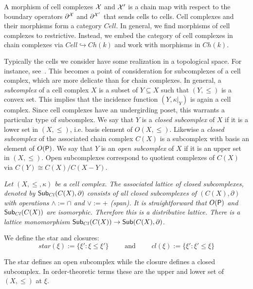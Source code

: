 A morphism of cell complexes ${\mathcal X}$ and  ${\mathcal X}'$ is a chain map with respect to the boundary operators $\partial^{\mathcal X}$ and $\partial^{{\mathcal X}'}$ that sends cells to cells.  Cell complexes and their morphisms form a category $Cell$. In general, we find morphisms of cell complexes to restrictive.  Instead, we embed the category of cell complexes in chain complexes via $Cell\hookrightarrow Ch(k)$ and work with morphisms in $Ch(k)$.


Typically the cells we consider have some realization in a topological space.  For instance, see~\cite{braids}.   This becomes a point of consideration for subcomplexes of a cell complex, which are more delicate than for chain complexes.  In general, a {\em subcomplex} of a cell complex $X$ is a subset of $Y\subseteq X$ such that $(Y,\leq)$ is a convex set.  This implies that the incidence function $(Y,\kappa|_Y)$ is again a cell complex. Since cell complexes have an undergirding poset, this warrants a particular type of subcomplex.  We say that $Y$ is a {\em closed subcomplex} of $X$ if it is a lower set in $(X,\leq)$, i.e. basis element of $O(X,\leq)$.   Likewise a {\em closed subcomplex} of the associated chain complex $C(X)$ is a subcomplex with basis an element of $O({\mathsf P})$.  We say that $Y$ is an {\em open subcomplex} of $X$ if it is an upper set in $(X,\leq)$.  Open subcomplexes correspond to quotient complexes of $C(X)$ via $C(Y)\cong C(X)/C(X-Y)$.

\begin{ex}
{\em
Let $(X,\leq,\kappa)$ be a cell complex.  The associated {\em lattice of closed subcomplexes}, denoted by $\mathsf{Sub}_{Cl}(C(X),\partial)$ consists of all closed subcomplexes of $(C(X),\partial)$ with operations $\wedge:= \cap$ and $\vee := +$ (span).  It is straightforward that $O({\mathsf P})$ and $\mathsf{Sub}_{Cl}(C(X))$ are isomorphic.  Therefore this is a distributive lattice.  There is a lattice monomorphism $\mathsf{Sub}_{Cl}(C(X))\to \mathsf{Sub}(C(X),\partial)$.
}
\end{ex}

We define the star and closures: 
\[
star(\xi):= \{\xi': \xi \leq \xi'\}\quad\quad \text{ and } \quad\quad cl(\xi) := \{\xi':\xi'\leq \xi\}
\]

The star defines an open subcomplex while the closure defines a closed subcomplex.  In order-theoretic terms these are the upper and lower set of $(X,\leq)$ at $\xi$.



